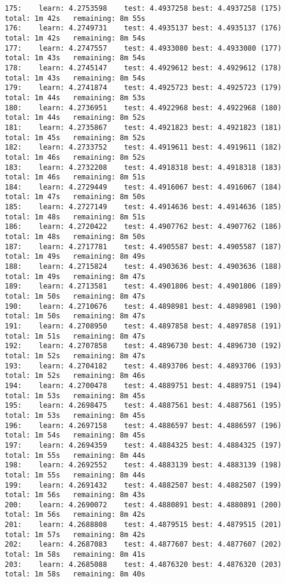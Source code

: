 \documentclass[11pt]{article}
\begin{document}
\begin{Verbatim}[commandchars=\\\{\}]
175:	learn: 4.2753598	test: 4.4937258	best: 4.4937258 (175)	total: 1m 42s	remaining: 8m 55s
176:	learn: 4.2749731	test: 4.4935137	best: 4.4935137 (176)	total: 1m 42s	remaining: 8m 54s
177:	learn: 4.2747557	test: 4.4933080	best: 4.4933080 (177)	total: 1m 43s	remaining: 8m 54s
178:	learn: 4.2745147	test: 4.4929612	best: 4.4929612 (178)	total: 1m 43s	remaining: 8m 54s
179:	learn: 4.2741874	test: 4.4925723	best: 4.4925723 (179)	total: 1m 44s	remaining: 8m 53s
180:	learn: 4.2736951	test: 4.4922968	best: 4.4922968 (180)	total: 1m 44s	remaining: 8m 52s
181:	learn: 4.2735867	test: 4.4921823	best: 4.4921823 (181)	total: 1m 45s	remaining: 8m 52s
182:	learn: 4.2733752	test: 4.4919611	best: 4.4919611 (182)	total: 1m 46s	remaining: 8m 52s
183:	learn: 4.2732208	test: 4.4918318	best: 4.4918318 (183)	total: 1m 46s	remaining: 8m 51s
184:	learn: 4.2729449	test: 4.4916067	best: 4.4916067 (184)	total: 1m 47s	remaining: 8m 50s
185:	learn: 4.2727149	test: 4.4914636	best: 4.4914636 (185)	total: 1m 48s	remaining: 8m 51s
186:	learn: 4.2720422	test: 4.4907762	best: 4.4907762 (186)	total: 1m 48s	remaining: 8m 50s
187:	learn: 4.2717781	test: 4.4905587	best: 4.4905587 (187)	total: 1m 49s	remaining: 8m 49s
188:	learn: 4.2715824	test: 4.4903636	best: 4.4903636 (188)	total: 1m 49s	remaining: 8m 47s
189:	learn: 4.2713581	test: 4.4901806	best: 4.4901806 (189)	total: 1m 50s	remaining: 8m 47s
190:	learn: 4.2710676	test: 4.4898981	best: 4.4898981 (190)	total: 1m 50s	remaining: 8m 47s
191:	learn: 4.2708950	test: 4.4897858	best: 4.4897858 (191)	total: 1m 51s	remaining: 8m 47s
192:	learn: 4.2707858	test: 4.4896730	best: 4.4896730 (192)	total: 1m 52s	remaining: 8m 47s
193:	learn: 4.2704182	test: 4.4893706	best: 4.4893706 (193)	total: 1m 52s	remaining: 8m 46s
194:	learn: 4.2700478	test: 4.4889751	best: 4.4889751 (194)	total: 1m 53s	remaining: 8m 45s
195:	learn: 4.2698475	test: 4.4887561	best: 4.4887561 (195)	total: 1m 53s	remaining: 8m 45s
196:	learn: 4.2697158	test: 4.4886597	best: 4.4886597 (196)	total: 1m 54s	remaining: 8m 45s
197:	learn: 4.2694359	test: 4.4884325	best: 4.4884325 (197)	total: 1m 55s	remaining: 8m 44s
198:	learn: 4.2692552	test: 4.4883139	best: 4.4883139 (198)	total: 1m 55s	remaining: 8m 44s
199:	learn: 4.2691432	test: 4.4882507	best: 4.4882507 (199)	total: 1m 56s	remaining: 8m 43s
200:	learn: 4.2690072	test: 4.4880891	best: 4.4880891 (200)	total: 1m 56s	remaining: 8m 42s
201:	learn: 4.2688808	test: 4.4879515	best: 4.4879515 (201)	total: 1m 57s	remaining: 8m 42s
202:	learn: 4.2687083	test: 4.4877607	best: 4.4877607 (202)	total: 1m 58s	remaining: 8m 41s
203:	learn: 4.2685088	test: 4.4876320	best: 4.4876320 (203)	total: 1m 58s	remaining: 8m 40s

\end{Verbatim}
\end{document}
